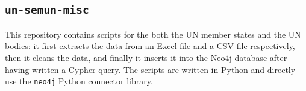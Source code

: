 

\subsection{\texttt{un-semun-misc}} \label{ssec:un-semun-misc}

This repository contains scripts for the both the UN member states and the UN bodies: it first extracts the data from an Excel file and a CSV file respectively, then it cleans the data, and finally it inserts it into the Neo4j database after having written a Cypher query. The scripts are written in Python and directly use the \texttt{neo4j} Python connector library.